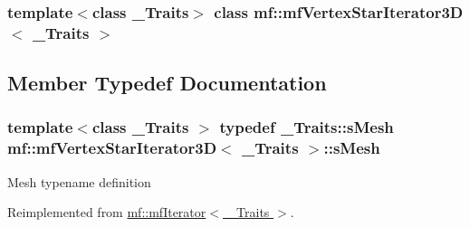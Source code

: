 \subsubsection*{template$<$class \_\-Traits$>$ class mf::mfVertexStarIterator3D$<$ \_\-Traits $>$}



\subsection{Member Typedef Documentation}
\hypertarget{classmf_1_1mfVertexStarIterator3D_aa45e0318e1153d3b373ec69af44d6710}{
\subsubsection[{sMesh}]{\setlength{\rightskip}{0pt plus 5cm}template$<$class \_\-Traits $>$ typedef \_\-Traits::sMesh {\bf mf::mfVertexStarIterator3D}$<$ \_\-Traits $>$::{\bf sMesh}}}
\label{classmf_1_1mfVertexStarIterator3D_aa45e0318e1153d3b373ec69af44d6710}
Mesh typename definition 

Reimplemented from \hyperlink{classmf_1_1mfIterator_aca31e4d7e7eca4e3b100530d8725064b}{mf::mfIterator$<$ \_\-Traits $>$}.



